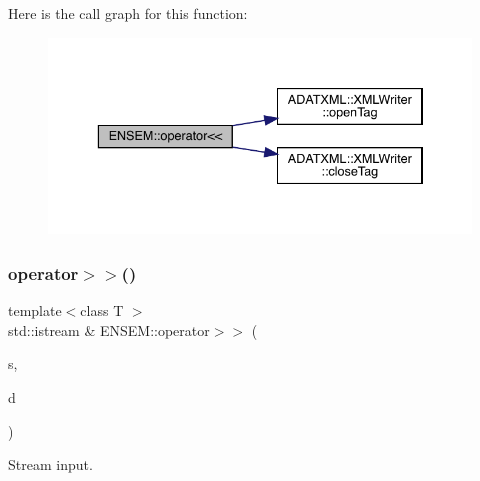 Here is the call graph for this function\+:\nopagebreak
\begin{figure}[H]
\begin{center}
\leavevmode
\includegraphics[width=336pt]{da/d59/group__obsvector_ga21a786931a7efb82964106799b422557_cgraph}
\end{center}
\end{figure}
\mbox{\label{group__obsvector_ga1777cce8b68792ed5e825b20f286394e}} 
\subsubsection{\texorpdfstring{operator$>$$>$()}{operator>>()}\hspace{0.1cm}{\footnotesize\ttfamily [1/2]}}
{\footnotesize\ttfamily template$<$class T $>$ \\
std\+::istream \& E\+N\+S\+E\+M\+::operator$>$$>$ (\begin{DoxyParamCaption}\item[{std\+::istream \&}]{s,  }\item[{\mbox{\hyperlink{classENSEM_1_1OVector}{O\+Vector}}$<$ T $>$ \&}]{d }\end{DoxyParamCaption})\hspace{0.3cm}{\ttfamily [inline]}}



Stream input. 

\mbox{\label{group__obsvector_gacb0aa516bb0d8f52c729250ac9faff3f}} 
